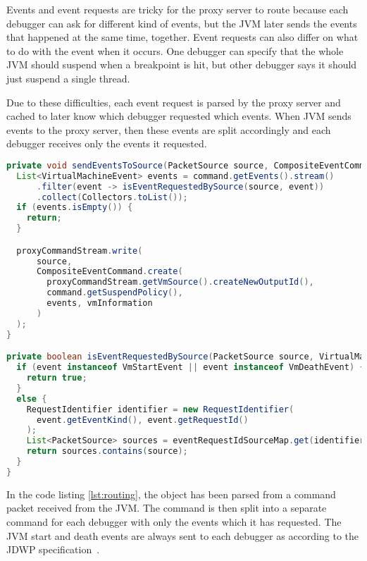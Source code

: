 \documentclass[..thesis.tex]{subfiles}
\begin{document}
Events and event requests are tricky for the proxy server to route because each debugger can ask for different kind of events, but the JVM later sends the events that happened at the same time, together.
Event requests can also differ on what to do with the event when it occurs.
One debugger can specify that the whole JVM should suspend when a breakpoint is hit, but other debugger says it should just suspend a single thread.

Due to these difficulties, each event request is parsed by the proxy server and cached to later know which debugger requested which events.
When JVM sends events to the proxy server, then these events are split accordingly and each debugger receives only the events it requested.

\begin{lstlisting}[language=Java, caption={\textit{Methods for sending only the requested events to a debugger.}}, captionpos=b, label={lst:routing}]
private void sendEventsToSource(PacketSource source, CompositeEventCommand command) {
  List<VirtualMachineEvent> events = command.getEvents().stream()
      .filter(event -> isEventRequestedBySource(source, event))
      .collect(Collectors.toList());
  if (events.isEmpty()) {
    return;
  }

  proxyCommandStream.write(
      source,
      CompositeEventCommand.create(
        proxyCommandStream.getVmSource().createNewOutputId(), 
        command.getSuspendPolicy(), 
        events, vmInformation
      )
  );
}

private boolean isEventRequestedBySource(PacketSource source, VirtualMachineEvent event){
  if (event instanceof VmStartEvent || event instanceof VmDeathEvent) {
    return true;
  }
  else {
    RequestIdentifier identifier = new RequestIdentifier(
      event.getEventKind(), event.getRequestId()
    );
    List<PacketSource> sources = eventRequestIdSourceMap.get(identifier);
    return sources.contains(source);
  }
}
\end{lstlisting}

In the code listing \ref{lst:routing}, the  object has been parsed from a command packet received from the JVM.
The command is then split into a separate command for each debugger with only the events which it has requested.
The JVM start and death events are always sent to each debugger as according to the JDWP specification~\cite{oracle_jdwp_spec}.
\end{document}
